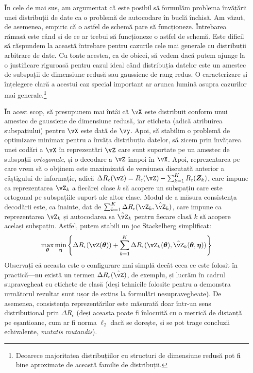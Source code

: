 \documentclass[../../book-main_ro.tex]{subfiles}
\begin{document}
În cele de mai sus, am argumentat că este posibil să formulăm problema învățării unei distribuții de date ca o problemă de autocodare în buclă închisă. Am văzut, de asemenea, empiric că o astfel de schemă pare să funcționeze. Întrebarea rămasă este când și de ce ar trebui să funcționeze o astfel de schemă. Este dificil să răspundem la această întrebare pentru cazurile cele mai generale cu distribuții arbitrare de date. Cu toate acestea, ca de obicei, să vedem dacă putem ajunge la o justificare riguroasă pentru cazul ideal când distribuția datelor este un amestec de subspații de dimensiune redusă sau gaussiene de rang redus. O caracterizare și înțelegere clară a acestui caz special important ar arunca lumină asupra cazurilor mai generale.\footnote{Deoarece majoritatea distribuțiilor cu structuri de dimensiune redusă pot fi bine aproximate de această familie de distribuții.}

În acest scop, să presupunem mai întâi că \(\vX\) este distribuit conform unui amestec de gaussiene de dimensiune redusă, iar eticheta (adică atribuirea subspațiului) pentru \(\vX\) este dată de \(\vy\). Apoi, să stabilim o problemă de optimizare minimax pentru a învăța distribuția datelor, să zicem prin învățarea unei codări a \(\vX\) în reprezentări \(\vZ\) care sunt suportate pe un amestec de subspații \textit{ortogonale}, și o decodare a \(\vZ\) înapoi în \(\vX\). Apoi, reprezentarea pe care vrem să o obținem este maximizată de versiunea discutată anterior a câștigului de informație, adică \( \Delta R_{\epsilon}(\vZ) = R_{\epsilon}(\vZ) - \sum_{k=1}^K R_{\epsilon}(\bm Z_k) \), care impune ca reprezentarea \(\vZ_{k}\) a fiecărei clase \(k\) să acopere un subspațiu care este ortogonal pe subspațiile suport ale altor clase. Modul de a măsura consistența decodării este, ca înainte, dat de \(\sum_{k = 1}^{K}\Delta R_\epsilon(\vZ_{k}, \hat{\vZ}_{k})\), care impune ca reprezentarea \(\vZ_{k}\) și autocodarea sa \(\hat{\vZ}_{k}\) pentru fiecare clasă \(k\) să acopere același subspațiu. Astfel, putem stabili un joc Stackelberg simplificat:
\begin{equation}\label{eq:ctrl_msp_game}
    \max_{\bm \theta}\min_{\bm \eta}\bc{\Delta R_\epsilon(\vZ(\bm \theta)) + \sum_{k = 1}^{K}\Delta R_\epsilon(\vZ_{k}(\bm \theta), \hat{\vZ}_{k}(\bm \theta, \bm \eta))}
\end{equation}
Observați că aceasta este o configurare mai simplă decât ceea ce este folosit în practică---nu există un termen \(\Delta R_\epsilon(\hat{\vZ})\), de exemplu, și lucrăm în cadrul supravegheat cu etichete de clasă (deși tehnicile folosite pentru a demonstra următorul rezultat sunt ușor de extins la formulări nesupravegheate). De asemenea, consistența reprezentărilor este măsurată doar într-un sens distributional prin \(\Delta R_\epsilon\) (deși aceasta poate fi înlocuită cu o metrică de distanță pe eșantioane, cum ar fi norma \(\ell_{2}\) dacă se dorește, și se pot trage concluzii echivalente, \textit{mutatis mutandis}).
\end{document}
